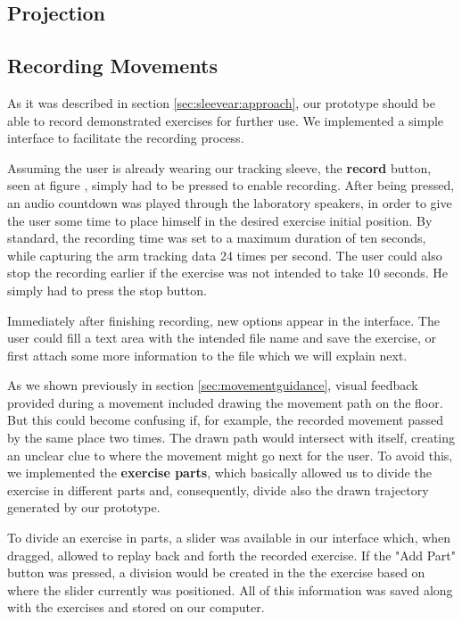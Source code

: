 
\subsection{Projection}
\label{prototype-projection}


\subsection{Recording Movements}

As it was described in section \ref{sec:sleevear:approach}, our prototype should be able to record demonstrated exercises for further use.
We implemented a simple interface to facilitate the recording process.

Assuming the user is already wearing our tracking sleeve, the \textbf{record} button, seen at figure , simply had to be pressed to enable recording. 
After being pressed, an audio countdown was played through the laboratory speakers, in order to give the user some time to place himself in the desired exercise initial position. 
By standard, the recording time was set to a maximum duration of ten seconds, while capturing the arm tracking data 24 times per second.
The user could also stop the recording earlier if the exercise was not intended to take 10 seconds. He simply had to press the stop button.

Immediately after finishing recording, new options appear in the interface. 
The user could fill a text area with the intended file name and save the exercise, or first attach some more information to the file which we will explain next.

As we shown previously in section \ref{sec:movementguidance}, visual feedback provided during a movement included drawing the movement path on the floor. 
But this could become confusing if, for example, the recorded movement passed by the same place two times. 
The drawn path would intersect with itself, creating an unclear clue to where the movement might go next for the user. 
To avoid this, we implemented the \textbf{exercise parts}, which basically allowed us to divide the exercise in different parts and, consequently, divide also the drawn trajectory generated by our prototype.

To divide an exercise in parts, a slider was available in our interface which, when dragged, allowed to replay back and forth the recorded exercise. 
If the "Add Part" button was pressed, a division would be created in the the exercise based on where the slider currently was positioned.
All of this information was saved along with the exercises and stored on our computer.



